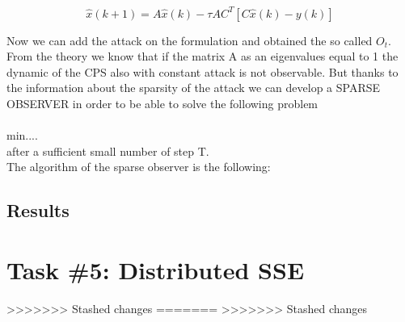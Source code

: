 \documentclass[a4paper,11pt]{article}
\begin{document}
    $$\hat{x}(k+1) = A\hat{x}(k) - \tau AC^T[C\hat{x}(k) - y(k)]$$

    Now we can add the attack on the formulation and obtained the so called  $O_t$. From the theory we know that if the matrix A as an eigenvalues equal to 1 the dynamic of the CPS also with constant attack is not observable.
    But thanks to the information about the sparsity of the attack we can develop a SPARSE OBSERVER in order to be able to solve the following problem \\
    \\min....
    \\after a sufficient small number of step T.
    \\The algorithm of the sparse observer is the following:
    
    
    
    
    
    \subsection*{Results}

    \section*{Task \#5: Distributed SSE}
>>>>>>> Stashed changes
=======
>>>>>>> Stashed changes




\end{document}
